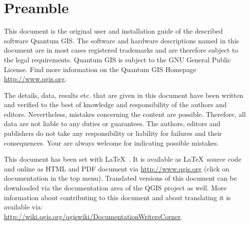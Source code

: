 \thispagestyle{empty}
\section*{Preamble}


\vspace{1cm}

This document is the original user and installation guide of the described 
software Quantum GIS. The software and hardware descriptions named in this 
document are in most cases registered trademarks and are therefore subject 
to the legal requirements. Quantum GIS is subject to the GNU General Public 
License. Find more information on the Quantum GIS Homepage \url{http://www.qgis.org}.

The details, data, results etc. that are given in this document have been 
written and verified to the best of knowledge and responsibility of the 
authors and editors. Nevertheless, mistakes concerning the content are possible. 
Therefore, all data are not liable to any duties or guarantees. The authors, editors 
and publishers do not take any responsibility or liability for failures and 
their consequences. Your are always welcome for indicating possible mistakes.

This document has been set with \LaTeX~. It is available as \LaTeX~source 
code and online as HTML and PDF document via \url{http://www.qgis.org} 
(click on documentation in the top menu).
Translated versions of this document can be downloaded via the documentation 
area of the QGIS project as well. 
More information about contributing to this document and 
about translating it is available via: \\
\url{http://wiki.qgis.org/qgiswiki/DocumentationWritersCorner}.  

